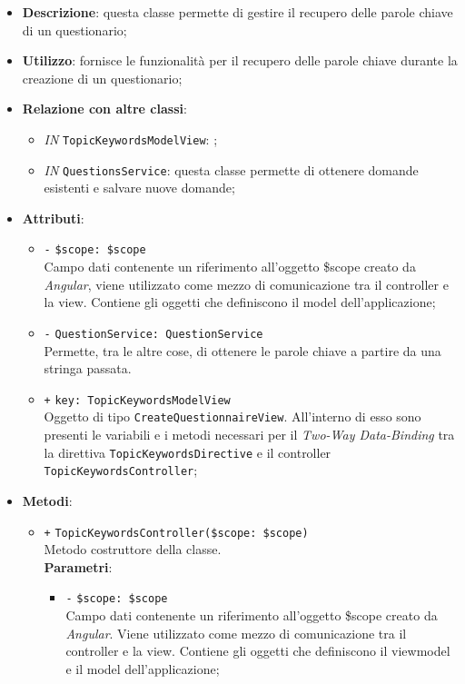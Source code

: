 \begin{itemize}
	\item \textbf{Descrizione}: questa classe permette di gestire il recupero delle parole chiave di un questionario;
	\item \textbf{Utilizzo}: fornisce le funzionalità per il recupero delle parole chiave durante la creazione di un questionario;
	\item \textbf{Relazione con altre classi}:
	\begin{itemize}
		\item \textit{IN} \texttt{TopicKeywordsModelView}: ; 
		\item \textit{IN} \texttt{QuestionsService}: questa classe permette di ottenere domande esistenti e salvare nuove domande;
	\end{itemize}
	\item \textbf{Attributi}:
	\begin{itemize}
		\item \texttt{-} \texttt{\$scope: \$scope} \\
		Campo dati contenente un riferimento all’oggetto \$scope creato da \textit{Angular}, viene utilizzato come mezzo di comunicazione tra il controller e la view. Contiene gli oggetti che definiscono il model dell’applicazione;
		\item \texttt{-} \texttt{QuestionService: QuestionService}\\ 
		Permette, tra le altre cose, di ottenere le parole chiave a partire da una stringa passata.
		\item \texttt{+} \texttt{key: TopicKeywordsModelView} \\
		Oggetto di tipo \texttt{CreateQuestionnaireView}. All'interno di esso sono presenti le variabili e i metodi necessari per il \textit{Two-Way Data-Binding} tra la direttiva \texttt{TopicKeywordsDirective} e il controller \texttt{TopicKeywordsController};
	\end{itemize}
	\item \textbf{Metodi}:
	\begin{itemize}
		\item \texttt{+} \texttt{TopicKeywordsController(\$scope: \$scope)} \\Metodo costruttore della classe. \\
		\textbf{Parametri}:
		\begin{itemize}
			\item \texttt{-} \texttt{\$scope: \$scope} \\
			Campo dati contenente un riferimento all’oggetto \$scope creato da \textit{Angular}. Viene utilizzato come mezzo di comunicazione tra il controller e la view. Contiene gli oggetti che definiscono il viewmodel e il model dell’applicazione; 

\end{itemize}
\end{itemize}
\end{itemize}

